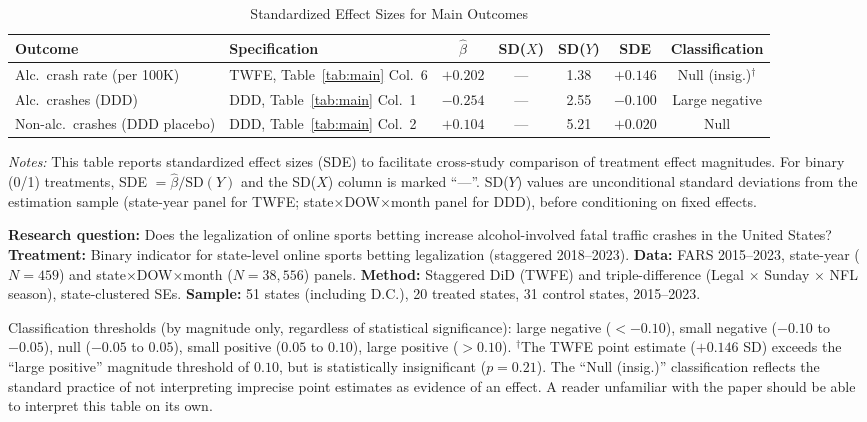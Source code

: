 \documentclass[12pt]{article}
\begin{document}
\begin{table}[H]
\centering
\caption{Standardized Effect Sizes for Main Outcomes}
\label{tab:sde}
\begin{adjustbox}{max width=\textwidth}
\begin{tabular}{llccccc}
\toprule
Outcome & Specification & $\hat{\beta}$ & SD($X$) & SD($Y$) & SDE & Classification \\
\midrule
Alc.\ crash rate (per 100K) & TWFE, Table~\ref{tab:main} Col.\ 6 & $+0.202$ & --- & 1.38 & $+0.146$ & Null (insig.)$^\dagger$ \\
Alc.\ crashes (DDD) & DDD, Table~\ref{tab:main} Col.\ 1 & $-0.254$ & --- & 2.55 & $-0.100$ & Large negative \\
Non-alc.\ crashes (DDD placebo) & DDD, Table~\ref{tab:main} Col.\ 2 & $+0.104$ & --- & 5.21 & $+0.020$ & Null \\
\bottomrule
\end{tabular}
\end{adjustbox}
\par\vspace{0.3em}
{\footnotesize \emph{Notes:} This table reports standardized effect sizes (SDE)
to facilitate cross-study comparison of treatment effect magnitudes.
For binary (0/1) treatments, SDE $= \hat{\beta} / \text{SD}(Y)$ and the SD($X$)
column is marked ``---''.
SD($Y$) values are unconditional standard deviations from the estimation sample
(state-year panel for TWFE; state$\times$DOW$\times$month panel for DDD), before
conditioning on fixed effects.

\textbf{Research question:} Does the legalization of online sports betting increase alcohol-involved fatal traffic crashes in the United States?
\textbf{Treatment:} Binary indicator for state-level online sports betting legalization (staggered 2018--2023).
\textbf{Data:} FARS 2015--2023, state-year ($N = 459$) and state$\times$DOW$\times$month ($N = 38{,}556$) panels.
\textbf{Method:} Staggered DiD (TWFE) and triple-difference (Legal $\times$ Sunday $\times$ NFL season), state-clustered SEs.
\textbf{Sample:} 51 states (including D.C.), 20 treated states, 31 control states, 2015--2023.

Classification thresholds (by magnitude only, regardless of statistical significance):
large negative ($< -0.10$), small negative ($-0.10$ to $-0.05$),
null ($-0.05$ to $0.05$), small positive ($0.05$ to $0.10$),
large positive ($> 0.10$).
$^\dagger$The TWFE point estimate ($+0.146$ SD) exceeds the ``large positive'' magnitude threshold of $0.10$, but is statistically insignificant ($p = 0.21$). The ``Null (insig.)'' classification reflects the standard practice of not interpreting imprecise point estimates as evidence of an effect.
A reader unfamiliar with the paper should be able to interpret this table
on its own.}
\end{table}
\end{document}
